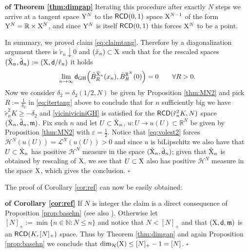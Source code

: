 \documentclass[reqno,11pt]{article}
\numberwithin{equation}{section}
\newcommand{\N}{\mathbb{N}}
\newcommand{\R}{\mathbb{R}}
\newcommand{\mm}{{\mbox{\boldmath$m$}}}
\newcommand{\sfd}{{\sf d}}
\newcommand{\eps}{\varepsilon}
\renewcommand{\mm}{\mathfrak m}                                %
\newenvironment{proofb}{\removelastskip\par\medskip   %
\noindent{\em{\bf Proof}} \rm}{\penalty-20\null\hfill$\square$\par\medbreak}
\newcommand{\X}{{\rm X}}
\newcommand{\Y}{{\rm Y}}
\newcommand{\RCD}{{\sf RCD}}
\newcommand{\HH}{{\mathcal H}}
\begin{document}
\begin{proofb}{\bf of Theorem \ref{thm:dimgap}}
Iterating this procedure after exactly $N$ steps we arrive at a tangent space $\Y^N$ to the $\RCD(0,1)$ space $\X^{N-1}$ of the form $\Y^N=\R\times\X^N$, and since $\Y^N$ is itself $\RCD(0,1)$ this forces $\X^N$ to be a point.

In summary, we proved  claim \eqref{eq:claimtang}. Therefore  by a diagonalization argument there is $\tilde r_n\downarrow 0$ and $(\tilde x_n)\subset \X$ such that for the rescaled spaces $(\tilde \X_n,\tilde \sfd_n):=(\X,\sfd/\tilde r_n)$ it holds
\begin{equation}
\label{eq:itertang}
\lim_{n\to\infty}\sfd_{\rm GH}\Big(\bar B_R^{\tilde \X_n}(x_n),\bar B_R^{\R^N}(0)\Big)= 0\qquad\forall R>0.
\end{equation}
Now we consider  $\delta_2=\delta_2(1/2,N)$ be given by Proposition \ref{thm:MN2} and pick $R:=\frac1{\delta_2}$ in \eqref{eq:itertang} above to conclude that for $n$ sufficiently big we have $\tilde r_n^2K\geq-\delta_2$ and \eqref{viciniviciniGH} is satisfied for the $\RCD(\tilde r_n^2K,N)$ space $(\tilde \X_n,\tilde \sfd_n,\mm)$. Fix such $n$ and let $U\subset \tilde\X_n$, $u:U\to u(U)\subset \R^N$ be given by Proposition  \ref{thm:MN2} with $\eps=\frac12$. Notice that \eqref{eq:volest2} forces $\HH^N(u(U))=\mathcal L^N(u(U))>0$ and since $u$ is biLipschitz we also have that $U\subset \tilde \X_{n}$ has positive $\HH^N$ measure in the space $(\tilde \X_n,\tilde\sfd_n)$; given that $\tilde \X_n$ is obtained by rescaling of $\X$, we see that $U\subset \X$ also has positive $\HH^N$ measure in the space $\X$, which gives the conclusion.
\end{proofb}
{The proof of Corollary \ref{cor:ref} can now be easily obtained:
\begin{proofb}{\bf of Corollary \ref{cor:ref}} If $N$ is integer the claim is a direct consequence of Proposition \ref{prop:basehn} (see also \cite[Corollary 2.3]{Sturm06II}). Otherwise let $[N]_+:=\min\{n\in\N:N\leq n\}$ and notice that $N<[N]_+$ and that $(\X,\sfd,\mm)$ is an $\RCD(K,[N]_+)$ space. Thus by Theorem \ref{thm:dimgap} and again Proposition \ref{prop:basehn} we conclude that $\dim_\HH(\X)\leq [N]_+-1=[N]$.
\end{proofb}
}
\end{document}
